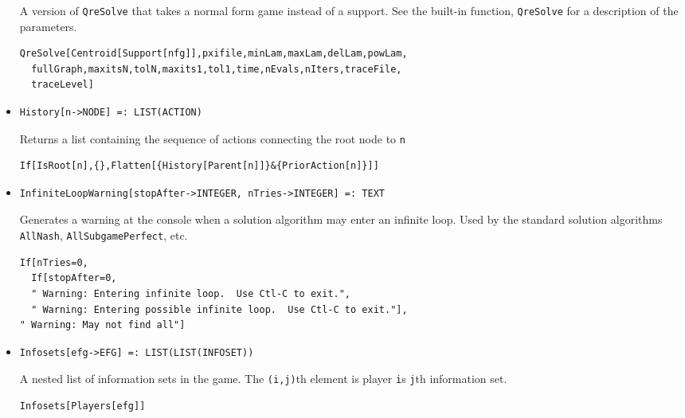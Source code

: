 \begin{itemize}
\bd 
A version of \verb+QreSolve+ that takes a normal form
game instead of a support.  See the built-in function,
\verb+QreSolve+ for a description of the parameters.
\begin{verbatim}
QreSolve[Centroid[Support[nfg]],pxifile,minLam,maxLam,delLam,powLam,
  fullGraph,maxitsN,tolN,maxits1,tol1,time,nEvals,nIters,traceFile,
  traceLevel]
\end{verbatim} 
\ed


\item{}
\protect \large \begin{verbatim}
History[n->NODE] =: LIST(ACTION) 
\end{verbatim}\normalsize

\bd 
Returns a list containing the sequence of actions connecting the root
node to \verb+n+
\begin{verbatim}
If[IsRoot[n],{},Flatten[{History[Parent[n]]}&{PriorAction[n]}]]
\end{verbatim} 
\ed


\item{}
\protect \large \begin{verbatim}
InfiniteLoopWarning[stopAfter->INTEGER, nTries->INTEGER] =: TEXT 
\end{verbatim}\normalsize

\bd 
Generates a warning at the console when a solution algorithm may enter
an infinite loop.  Used by the standard solution algorithms
\verb+AllNash+, \verb+AllSubgamePerfect+, etc.  

\begin{verbatim}
If[nTries=0,
  If[stopAfter=0,
  " Warning: Entering infinite loop.  Use Ctl-C to exit.",  
  " Warning: Entering possible infinite loop.  Use Ctl-C to exit."],
" Warning: May not find all"]
\end{verbatim} 
\ed

\item{}
\protect \large \begin{verbatim}
Infosets[efg->EFG] =: LIST(LIST(INFOSET)) 
\end{verbatim}\normalsize

\bd 
A nested list of information sets in the game. The \verb+(i,j)+th
element is player \verb+i+s \verb+j+th information set.  
\begin{verbatim}
Infosets[Players[efg]]
\end{verbatim} 
\ed


\end{itemize}
